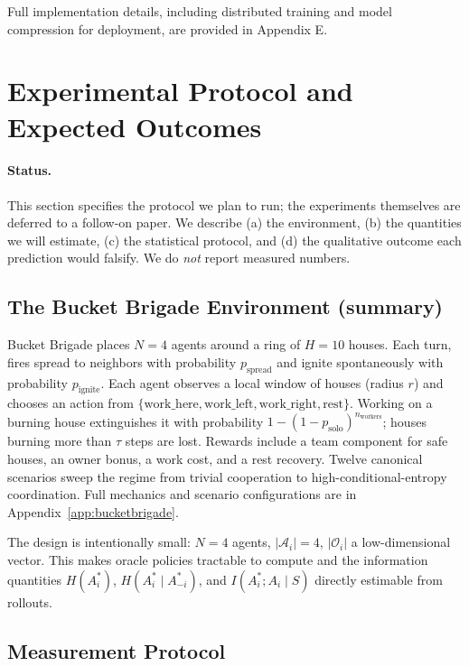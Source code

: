 \documentclass[10pt, letterpaper]{article}
\begin{document}
Full implementation details, including distributed training and model compression for deployment, are provided in Appendix E.

\section{Experimental Protocol and Expected Outcomes}
\label{sec:experiments}

\paragraph{Status.} This section specifies the protocol we plan to run; the experiments themselves are deferred to a follow-on paper. We describe (a) the environment, (b) the quantities we will estimate, (c) the statistical protocol, and (d) the qualitative outcome each prediction would falsify. We do \emph{not} report measured numbers.

\subsection{The Bucket Brigade Environment (summary)}

Bucket Brigade places $N{=}4$ agents around a ring of $H{=}10$ houses. Each turn, fires spread to neighbors with probability $p_\text{spread}$ and ignite spontaneously with probability $p_\text{ignite}$. Each agent observes a local window of houses (radius $r$) and chooses an action from $\{\text{work\_here}, \text{work\_left}, \text{work\_right}, \text{rest}\}$. Working on a burning house extinguishes it with probability $1 - (1-p_\text{solo})^{n_\text{workers}}$; houses burning more than $\tau$ steps are lost. Rewards include a team component for safe houses, an owner bonus, a work cost, and a rest recovery. Twelve canonical scenarios sweep the regime from trivial cooperation to high-conditional-entropy coordination. Full mechanics and scenario configurations are in Appendix~\ref{app:bucketbrigade}.

The design is intentionally small: $N{=}4$ agents, $|\mathcal{A}_i|{=}4$, $|\mathcal{O}_i|$ a low-dimensional vector. This makes oracle policies tractable to compute and the information quantities $H(A_i^*)$, $H(A_i^* \mid A_{-i}^*)$, and $I(A_i^*; A_i \mid S)$ directly estimable from rollouts.

\subsection{Measurement Protocol}
\end{document}
